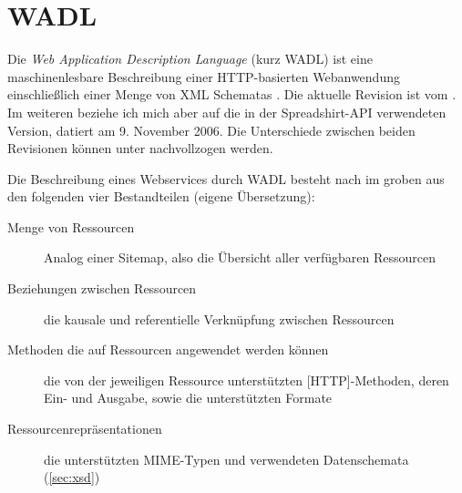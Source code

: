 \section{WADL}
\label{sec:wadl}

Die \emph{Web Application Description Language} (kurz \gls{WADL}) ist eine maschinenlesbare Beschreibung einer \gls{HTTP}-basierten Webanwendung einschließlich einer Menge von \gls{XML} Schematas \cite{hadleyWADL}.
Die aktuelle Revision ist vom  \cite{WADLcurrent}. Im weiteren beziehe ich mich aber auf die in der Spreadshirt-\gls{API} verwendeten Version, datiert am 9. November 2006. Die Unterschiede zwischen beiden Revisionen können unter \cite{WADLchanges} nachvollzogen werden.

Die Beschreibung eines Webservices durch \gls{WADL} besteht nach \cite{hadleyWADL} im groben aus den folgenden vier Bestandteilen (eigene Übersetzung):
\begin{description}
     \item[Menge von Ressourcen] Analog einer Sitemap, also die Übersicht aller verfügbaren Ressourcen
     \item[Beziehungen zwischen Ressourcen] die kausale und referentielle Verknüpfung zwischen Ressourcen
     \item[Methoden die auf Ressourcen angewendet werden können] die von der jeweiligen Ressource unterstützten [\gls{HTTP}]-Methoden, deren Ein- und Ausgabe, sowie die unterstützten Formate
     \item[Ressourcenrepräsentationen] die unterstützten \gls{MIME}-Typen und verwendeten Datenschemata (\cref{sec:xsd})
 \end{description} 

